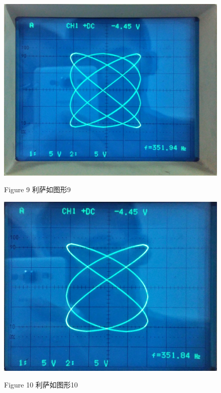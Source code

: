 \documentclass[a4paper,10pt,notitlepage]{report}
\begin{document}
\begin{figure}[htbp]
\centering

	\includegraphics[scale=.1]{L09.jpg}
	\begin{center}
		\scriptsize Figure 9 利萨如图形9
	\end{center}

\end{figure}
	
\begin{figure}[htbp]
\centering

	\includegraphics[scale=.11]{L10.jpg}
	\begin{center}
		\scriptsize Figure 10 利萨如图形10
	\end{center}

\end{figure}
\end{document}
